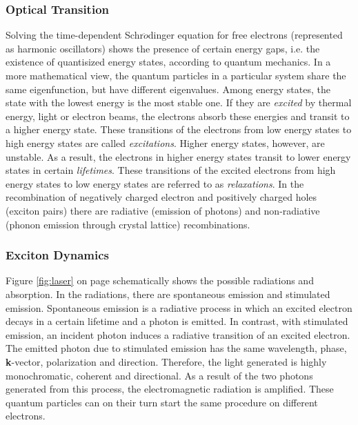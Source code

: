 	\subsubsection{Optical Transition}
\cite{laser_fundamental}Solving the time-dependent Schr$\ddot{o}$dinger equation for free electrons (represented as harmonic oscillators) shows the presence of certain energy gaps, i.e. the existence of quantisized energy states, according to quantum mechanics. In a more mathematical view, the quantum particles in a particular system share the same eigenfunction, but have different eigenvalues. Among energy states, the state with the lowest energy is the most stable one. If they are \textit{excited} by thermal energy, light or electron beams, the electrons absorb these energies and transit to a higher energy state. These transitions of the electrons from low energy states to high energy states are called \textit{excitations}. Higher energy states, however, are unstable. As a result, the electrons in higher energy states transit to lower energy states in certain \textit{lifetimes}. These transitions of the excited electrons from high energy states to low energy states are referred to as \textit{relaxations}. In the recombination of negatively charged electron and positively charged holes (exciton pairs) there are radiative (emission of photons) and non-radiative (phonon emission through crystal lattice) recombinations.

	\subsubsection{Exciton Dynamics}   
Figure \ref{fig:laser} on page \pageref{fig:laser} schematically shows the possible radiations and absorption. In the radiations, there are spontaneous emission and stimulated emission. Spontaneous emission is a radiative process in which an excited electron decays in a certain lifetime and a photon is emitted. In contrast, with stimulated emission, an incident photon induces a radiative transition of an excited electron. The emitted photon due to stimulated emission has the same wavelength, phase, \textbf{k}-vector, polarization and direction. Therefore, the light generated is highly monochromatic, coherent and directional. As a result of the two photons generated from this process, the electromagnetic radiation is amplified. These quantum particles can on their turn start the same procedure on different electrons. 

